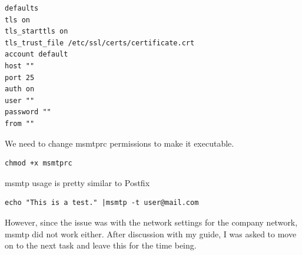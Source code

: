\documentclass[a4paper,12pt]{article}
\begin{document}
\begin{lstlisting}[style=ShellStyle]
defaults
tls on
tls_starttls on
tls_trust_file /etc/ssl/certs/certificate.crt
account default
host ""
port 25
auth on
user ""
password ""
from ""
\end{lstlisting}
We need to change msmtprc permissions to make it executable.
\begin{lstlisting}[style=ShellStyle]
chmod +x msmtprc
\end{lstlisting}
msmtp usage is pretty similar to Postfix 
\begin{lstlisting}[style=ShellStyle]
echo "This is a test." |msmtp -t user@mail.com
\end{lstlisting}
However, since the issue was with the network settings for the company network, msmtp did not work either. After discussion with my guide, I was asked to move on to the next task and leave this for the time being.\\
\end{document}
